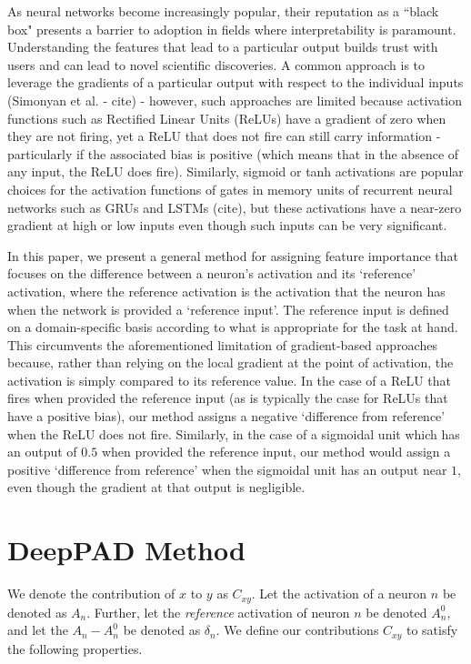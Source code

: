 \documentclass{article}
\begin{document}
As neural networks become increasingly popular, their reputation as a ``black box" presents a barrier to adoption in fields where interpretability is paramount. Understanding the features that lead to a particular output builds trust with users and can lead to novel scientific discoveries. A common approach is to leverage the gradients of a particular output with respect to the individual inputs (Simonyan et al. - cite) - however, such approaches are limited because activation functions such as Rectified Linear Units (ReLUs) have a gradient of zero when they are not firing, yet a ReLU that does not fire can still carry information - particularly if the associated bias is positive (which means that in the absence of any input, the ReLU does fire). Similarly, sigmoid or tanh activations are popular choices for the activation functions of gates in memory units of recurrent neural networks such as GRUs and LSTMs (cite), but these activations have a near-zero gradient at high or low inputs even though such inputs can be very significant.

In this paper, we present a general method for assigning feature importance that focuses on the difference between a neuron's activation and its `reference' activation, where the reference activation is the activation that the neuron has when the network is provided a `reference input'. The reference input is defined on a domain-specific basis according to what is appropriate for the task at hand. This circumvents the aforementioned limitation of gradient-based approaches because, rather than relying on the local gradient at the point of activation, the activation is simply compared to its reference value. In the case of a ReLU that fires when provided the reference input (as is typically the case for ReLUs that have a positive bias), our method assigns a negative `difference from reference' when the ReLU does not fire. Similarly, in the case of a sigmoidal unit which has an output of $0.5$ when provided the reference input, our method would assign a positive `difference from reference' when the sigmoidal unit has an output near $1$, even though the gradient at that output is negligible.

\section{DeepPAD Method}
\label{PAD}

We denote the contribution of $x$ to $y$ as $C_{xy}$. Let the activation of a neuron $n$ be denoted as $A_n$. Further, let the \emph{reference} activation of neuron $n$ be denoted $A_n^0$, and let the $A_n - A_n^0$ be denoted as $\delta_n$. We define our contributions $C_{xy}$ to satisfy the following properties.
\end{document}
